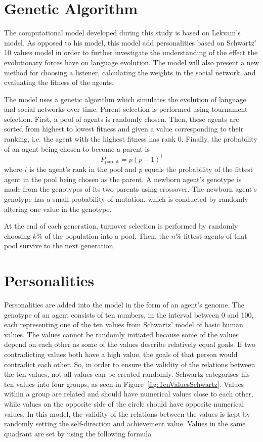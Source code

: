 \section{Genetic Algorithm}

The computational model developed during this study is based on Lekvam’s model. As opposed to his model, this model add personalities based on Schwartz' 10 values model \citep{lekvam2014co, schwartz2012overview} in order to further investigate the understanding of the effect the evolutionary forces have on language evolution. The model will also present a new method for choosing a listener, calculating the weights in the social network, and evaluating the fitness of the agents.

The model uses a genetic algorithm which simulates the evolution of language and social networks over time. Parent selection is performed using tournament selection. First, a pool of agents is randomly chosen. Then, these agents are sorted from highest to lowest fitness and given a value corresponding to their ranking, i.e. the agent with the highest fitness has rank 0. Finally, the probability of an agent being chosen to become a parent is
\begin{equation}
    \label{eq:TSelect}
    P_{\mathrm{parent}} = p(p-1)^{i}
\end{equation}
where $i$ is the agent's rank in the pool and $p$ equals the probability of the fittest agent in the pool being chosen as the parent. A newborn agent's genotype is made from the genotypes of its two parents using crossover. The newborn agent's genotype has a small probability of mutation, which is conducted by randomly altering one value in the genotype.

At the end of each generation, turnover selection is performed by randomly choosing $k\%$ of the population into a pool. Then, the $n\%$ fittest agents of that pool survive to the next generation.

\section{Personalities}

Personalities are added into the model in the form of an agent’s genome. The genotype of an agent consists of ten numbers, in the interval between 0 and 100, each representing one of the ten values from Schwartz' model of basic human values. The values cannot be randomly initiated because some of the values depend on each other as some of the values describe relatively equal goals. If two contradicting values both have a high value, the goals of that person would contradict each other. So, in order to ensure the validity of the relations between the ten values, not all values can be created randomly. Schwartz categorises his ten values into four groups, as seen in Figure~\ref{fig:TenValuesSchwartz}. Values within a group are related and should have numerical values close to each other, while values on the opposite side of the circle should have opposite numerical values. In this model, the validity of the relations between the values is kept by randomly setting the self-direction and achievement value. Values in the same quadrant are set by using the following formula

